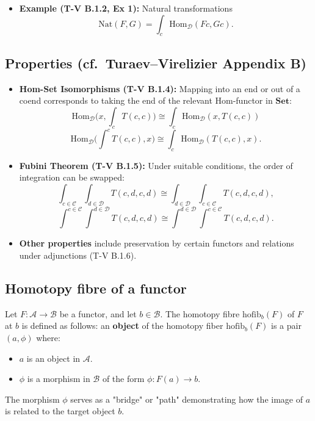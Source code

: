 \documentclass[11pt]{article}
\newcommand{\cat}[1]{\mathcal{#1}}
\theoremstyle{definition}
\begin{document}
\begin{itemize}
    \item \textbf{Example (T-V B.1.2, Ex 1):} Natural transformations 
    \[
    \mathrm{Nat}(F,G) = \int_c \mathrm{Hom}_{\mathcal{D}}(F c, G c).
    \]
\end{itemize}

\subsection*{Properties (cf.\ Turaev--Virelizier Appendix B)}

\begin{itemize}
    \item \textbf{Hom-Set Isomorphisms (T-V B.1.4):} Mapping into an end or out of a coend corresponds to taking the end of the relevant Hom-functor in \(\mathbf{Set}\):
    \[
    \mathrm{Hom}_{\mathcal{D}} \bigl(x, \int_c T(c,c) \bigr) \cong \int_c \mathrm{Hom}_{\mathcal{D}}(x, T(c,c))
    \]
    \[
    \mathrm{Hom}_{\mathcal{D}} \bigl(\int^c T(c,c), x \bigr) \cong \int_c \mathrm{Hom}_{\mathcal{D}}(T(c,c), x).
    \]
    \item \textbf{Fubini Theorem (T-V B.1.5):} Under suitable conditions, the order of integration can be swapped:
    \[
    \int_{c \in \mathcal{C}} \int_{d \in \mathcal{D}} T(c,d,c,d) \cong \int_{d \in \mathcal{D}} \int_{c \in \mathcal{C}} T(c,d,c,d),
    \]
    \[
    \int^{c \in \mathcal{C}} \int^{d \in \mathcal{D}} T(c,d,c,d) \cong \int^{d \in \mathcal{D}} \int^{c \in \mathcal{C}} T(c,d,c,d).
    \]
    \item \textbf{Other properties} include preservation by certain functors and relations under adjunctions (T-V B.1.6).
\end{itemize}



\subsection{Homotopy fibre of  a functor}

Let $F: \cat{A} \to \cat{B}$ be a functor, and let $b \in \cat{B}$. The homotopy fibre $\mathrm{hofib}_b(F)$ of $F$ at $b$ is defined as follows: an \textbf{object} of the homotopy fiber $\mathrm{hofib}_b(F)$ is a pair $(a, \phi)$ where:
\begin{itemize}
    \item $a$ is an object in $\mathcal{A}$.
    \item $\phi$ is a morphism in $\mathcal{B}$ of the form $\phi : F(a) \to b$.
\end{itemize}
The morphism $\phi$ serves as a "bridge" or "path" demonstrating how the image of $a$ is related to the target object $b$.
\end{document}
